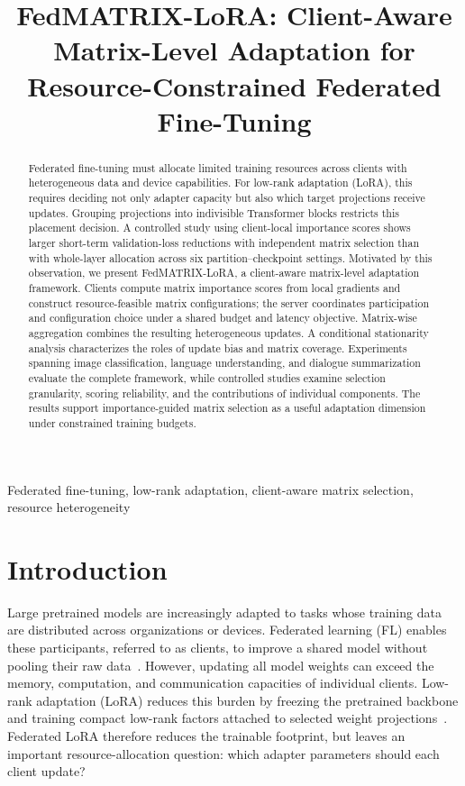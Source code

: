 \documentclass[10pt,conference,letterpaper]{IEEEtran}
\title{FedMATRIX-LoRA: Client-Aware Matrix-Level Adaptation for Resource-Constrained Federated Fine-Tuning}
\author{\IEEEauthorblockN{Anonymous Authors}}
\begin{document}
\maketitle

\begin{abstract}
Federated fine-tuning must allocate limited training resources across clients with heterogeneous data and device capabilities. For low-rank adaptation (LoRA), this requires deciding not only adapter capacity but also which target projections receive updates. Grouping projections into indivisible Transformer blocks restricts this placement decision. A controlled study using client-local importance scores shows larger short-term validation-loss reductions with independent matrix selection than with whole-layer allocation across six partition--checkpoint settings. Motivated by this observation, we present FedMATRIX-LoRA, a client-aware matrix-level adaptation framework. Clients compute matrix importance scores from local gradients and construct resource-feasible matrix configurations; the server coordinates participation and configuration choice under a shared budget and latency objective. Matrix-wise aggregation combines the resulting heterogeneous updates. A conditional stationarity analysis characterizes the roles of update bias and matrix coverage. Experiments spanning image classification, language understanding, and dialogue summarization evaluate the complete framework, while controlled studies examine selection granularity, scoring reliability, and the contributions of individual components. The results support importance-guided matrix selection as a useful adaptation dimension under constrained training budgets.

\end{abstract}

\begin{IEEEkeywords}
Federated fine-tuning, low-rank adaptation, client-aware matrix selection, resource heterogeneity
\end{IEEEkeywords}

\section{Introduction}
Large pretrained models are increasingly adapted to tasks whose training data are distributed across organizations or devices. Federated learning (FL) enables these participants, referred to as clients, to improve a shared model without pooling their raw data~\cite{mcmahan2017communication,kairouz2021advances}. However, updating all model weights can exceed the memory, computation, and communication capacities of individual clients. Low-rank adaptation (LoRA) reduces this burden by freezing the pretrained backbone and training compact low-rank factors attached to selected weight projections~\cite{hu2022lora}. Federated LoRA therefore reduces the trainable footprint, but leaves an important resource-allocation question: which adapter parameters should each client update?
\end{document}
